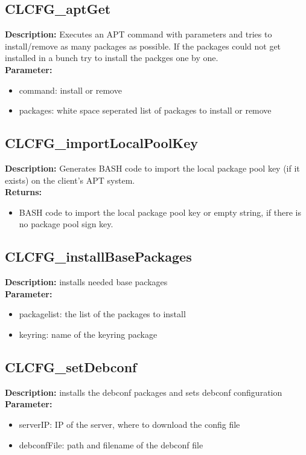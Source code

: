 \subsection{CLCFG\_aptGet}
\textbf{Description:} Executes an APT command with parameters and tries to install/remove as many packages as possible. If the packages could not get installed in a bunch try to install the packges one by one.\\
\textbf{Parameter:}
\begin{itemize}
\item command: install or remove
\item packages: white space seperated list of packages to install or remove
\end{itemize}

\subsection{CLCFG\_importLocalPoolKey}
\textbf{Description:} Generates BASH code to import the local package pool key (if it exists) on the client's APT system.\\
\textbf{Returns:}
\begin{itemize}
\item BASH code to import the local package pool key or empty string, if there is no package pool sign key.
\end{itemize}

\subsection{CLCFG\_installBasePackages}
\textbf{Description:} installs needed base packages\\
\textbf{Parameter:}
\begin{itemize}
\item packagelist: the list of the packages to install
\item keyring: name of the keyring package
\end{itemize}

\subsection{CLCFG\_setDebconf}
\textbf{Description:} installs the debconf packages and sets debconf configuration\\
\textbf{Parameter:}
\begin{itemize}
\item serverIP: IP of the server, where to download the config file
\item debconfFile: path and filename of the debconf file
\end{itemize}

